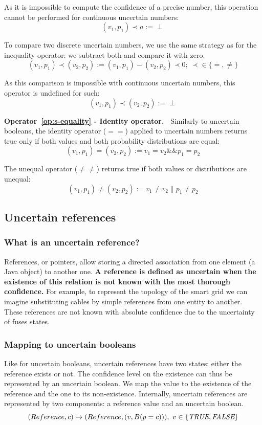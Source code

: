 As it is impossible to compute the confidence of a precise number, this operation cannot be performed for continuous uncertain numbers:
\[(v_1, p_1) \prec a := \perp\]

To compare two discrete uncertain numbers, we use the same strategy as for the inequality operator: we subtract both and compare it with zero.
\[(v_1,p_1) \prec (v_2,p_2) := (v_1,p_1) - (v_2,p_2) \prec 0;~\prec \in \{=, \ne\}\]

As this comparison is impossible with continuous uncertain numbers, this operator is undefined for such:
\[(v_1,p_1) \prec (v_2,p_2) := \perp\]

\noindent\textbf{Operator~\ref{op:s-equality} - Identity operator.~}
Similarly to uncertain booleans, the identity operator ($==$) applied to uncertain numbers returns true only if both values and both probability distributions are equal:
\[(v_1,p_1) = (v_2,p_2) := v_1 = v_2 \&\& p_1 = p_2\]

The unequal operator ($\ne\ne$) returns true if both values or distributions are unequal:
\[(v_1,p_1) \ne (v_2,p_2) := v_1 \ne v_2 \| p_{1} \ne p_{2}\]

\subsection{Uncertain references}
\subsubsection{What is an uncertain reference?}
References, or pointers, allow storing a directed association from one element (\eg a Java object) to another one.
\textbf{A reference is defined as uncertain when the existence of this relation is not known with the most thorough confidence.}
For example, to represent the topology of the smart grid we can imagine substituting cables by simple references from one entity to another.
These references are not known with absolute confidence due to the uncertainty of fuses states.

\subsubsection{Mapping to uncertain booleans}
Like for uncertain booleans, uncertain references have two states: either the reference exists or not.
The confidence level on the existence can thus be represented by an uncertain boolean.
We map the \true{} value to the existence of the reference and the \false{} one to its non-existence.
Internally, uncertain references are represented by two components: a reference value and an uncertain boolean.
\[(Reference, c) \mapsto (Reference, (v, B(p=c))),\ v \in \{\true{}, \false{}\}\]

